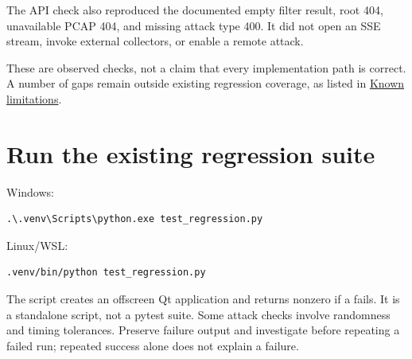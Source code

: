 The API check also reproduced the documented empty  filter result, root 404, unavailable PCAP 404, and missing attack type 400. It did not open an SSE stream, invoke external collectors, or enable a remote attack.

These are observed checks, not a claim that every implementation path is correct. A number of gaps remain outside existing regression coverage, as listed in \hyperref[chapter-16]{Known limitations}.

\section*{Run the existing regression suite}
\par\noindent\begin{minipage}{\linewidth}
Windows:
\begin{lstlisting}[title={POWERSHELL}]
.\.venv\Scripts\python.exe test_regression.py
\end{lstlisting}
\end{minipage}\par
\par\noindent\begin{minipage}{\linewidth}
Linux/WSL:
\begin{lstlisting}[title={BASH}]
.venv/bin/python test_regression.py
\end{lstlisting}
\end{minipage}\par
The script creates an offscreen Qt application and returns nonzero if a  fails. It is a standalone script, not a pytest suite. Some attack checks involve randomness and timing tolerances. Preserve failure output and investigate before repeating a failed run; repeated success alone does not explain a failure.

